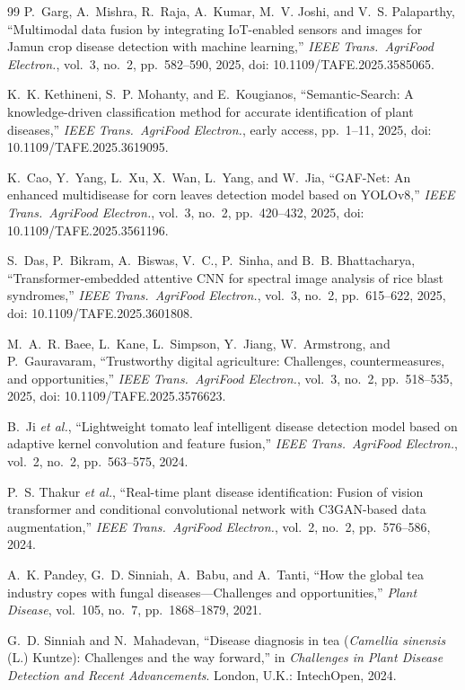 \documentclass[conference]{IEEEtran}
\begin{document}
\begin{thebibliography}{99}
P.~Garg, A.~Mishra, R.~Raja, A.~Kumar, M.~V. Joshi, and V.~S. Palaparthy,
``Multimodal data fusion by integrating IoT-enabled sensors and images for
Jamun crop disease detection with machine learning,'' \emph{IEEE Trans.\
AgriFood Electron.}, vol.~3, no.~2, pp.~582--590, 2025, doi:
10.1109/TAFE.2025.3585065.

K.~K. Kethineni, S.~P. Mohanty, and E.~Kougianos, ``Semantic-Search: A
knowledge-driven classification method for accurate identification of plant
diseases,'' \emph{IEEE Trans.\ AgriFood Electron.}, early access, pp.~1--11,
2025, doi: 10.1109/TAFE.2025.3619095.

K.~Cao, Y.~Yang, L.~Xu, X.~Wan, L.~Yang, and W.~Jia, ``GAF-Net: An enhanced
multidisease for corn leaves detection model based on YOLOv8,'' \emph{IEEE
Trans.\ AgriFood Electron.}, vol.~3, no.~2, pp.~420--432, 2025, doi:
10.1109/TAFE.2025.3561196.

S.~Das, P.~Bikram, A.~Biswas, V.~C., P.~Sinha, and B.~B. Bhattacharya,
``Transformer-embedded attentive CNN for spectral image analysis of rice blast
syndromes,'' \emph{IEEE Trans.\ AgriFood Electron.}, vol.~3, no.~2,
pp.~615--622, 2025, doi: 10.1109/TAFE.2025.3601808.

M.~A.~R. Baee, L.~Kane, L.~Simpson, Y.~Jiang, W.~Armstrong, and P.~Gauravaram,
``Trustworthy digital agriculture: Challenges, countermeasures, and
opportunities,'' \emph{IEEE Trans.\ AgriFood Electron.}, vol.~3, no.~2,
pp.~518--535, 2025, doi: 10.1109/TAFE.2025.3576623.

B.~Ji \emph{et al.}, ``Lightweight tomato leaf intelligent disease detection
model based on adaptive kernel convolution and feature fusion,'' \emph{IEEE
Trans.\ AgriFood Electron.}, vol.~2, no.~2, pp.~563--575, 2024.

P.~S. Thakur \emph{et al.}, ``Real-time
plant disease identification: Fusion of vision transformer and conditional
convolutional network with C3GAN-based data augmentation,'' \emph{IEEE Trans.\
AgriFood Electron.}, vol.~2, no.~2, pp.~576--586, 2024.

A.~K. Pandey, G.~D. Sinniah, A.~Babu, and A.~Tanti, ``How the global tea
industry copes with fungal diseases---Challenges and opportunities,''
\emph{Plant Disease}, vol.~105, no.~7, pp.~1868--1879, 2021.

G.~D. Sinniah and N.~Mahadevan, ``Disease diagnosis in tea
(\textit{Camellia sinensis} (L.) Kuntze): Challenges and the way forward,''
in \emph{Challenges in Plant Disease Detection and Recent Advancements}.
London, U.K.: IntechOpen, 2024.


\end{thebibliography}
\end{document}
